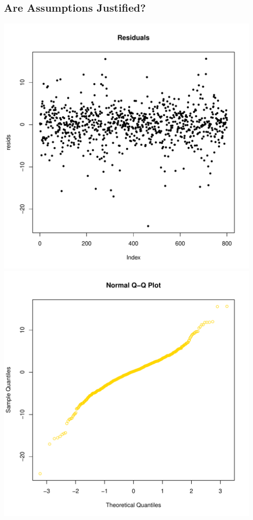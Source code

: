 \documentclass{article}                                                   %
\begin{document}
  \subsection{Are Assumptions Justified?}
    \includegraphics{raw/resids.pdf}
    \includegraphics{raw/qqnorm.pdf}
\end{document}
